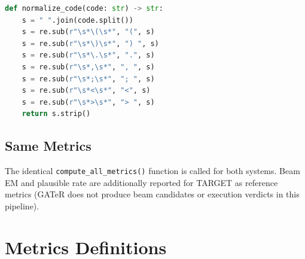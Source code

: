 \documentclass[11pt,a4paper]{article}
\begin{document}
\begin{lstlisting}[language=Python,caption={Code normalization}]
def normalize_code(code: str) -> str:
    s = " ".join(code.split())
    s = re.sub(r"\s*\(\s*", "(", s)
    s = re.sub(r"\s*\)\s*", ") ", s)
    s = re.sub(r"\s*\.\s*", ".", s)
    s = re.sub(r"\s*,\s*", ", ", s)
    s = re.sub(r"\s*;\s*", "; ", s)
    s = re.sub(r"\s*<\s*", "<", s)
    s = re.sub(r"\s*>\s*", "> ", s)
    return s.strip()
\end{lstlisting}

\subsection{Same Metrics}

The identical \texttt{compute\_all\_metrics()} function is called for
both systems. Beam EM and plausible rate are additionally reported for
TARGET as reference metrics (GATeR does not produce beam candidates or
execution verdicts in this pipeline).

\section{Metrics Definitions}
\label{sec:metrics}
\end{document}
